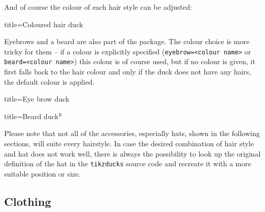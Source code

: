 \documentclass[parskip=half]{scrartcl}
\begin{document}
And of course the colour of each hair style can be adjusted:
\begin{tcblisting}{title={Coloured hair duck}}
\begin{tikzpicture}
	\duck[longhair=teal]
\end{tikzpicture}
\end{tcblisting}

Eyebrows and a beard are also part of the package. The colour choice is more tricky for them -- if a colour is explicitly specified (\lstinline|eyebrow=<colour name>| or \lstinline|beard=<colour name>|) this colour is of course used, but if no colour is given, it first falls back to the hair colour and only if the duck does not have any hairs, the default colour is applied.

\begin{tcblisting}{title={Eye brow duck}}
\begin{tikzpicture}
	\duck[eyebrow]
\end{tikzpicture}
\begin{tikzpicture}
	\duck[longhair=blue, 
		eyebrow]
\end{tikzpicture}

\begin{tikzpicture}
	\duck[crazyhair=red, 
		eyebrow=blue]
\end{tikzpicture}
\end{tcblisting}

\addtocounter{footnote}{1}
\begin{tcblisting}{title={Beard duck$^{\thefootnote}$}}
\begin{tikzpicture}
	\duck[beard=white!80!brown]
\end{tikzpicture}
\begin{tikzpicture}
	\duck[recedinghair=white,beard]
\end{tikzpicture}
\end{tcblisting}

Please note that not all of the accessories, especially hats, shown in the following sections, will suite every hairstyle. In case the desired combination of hair style and hat does not work well, there is always the possibility to look up the original definition of the hat in the \lstinline|tikzducks| source code and recreate it with a more suitable position or size.

\subsection{Clothing}
\end{document}
